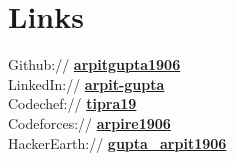 \documentclass[]{deedy-resume-openfont}
\begin{document}
\begin{minipage}[t]{0.35\textwidth}

\section{Links}
Github:// \href{https://github.com/arpitgupta1906}{\bf arpitgupta1906} \\
LinkedIn://  \href{https://www.linkedin.com/in/arpit-gupta-46462819b/}{\bf arpit-gupta} \\
Codechef://  \href{https://www.codechef.com/users/tipra19}{\bf tipra19} \\
Codeforces:// \href{https://codeforces.com/profile/arpire1906}{\bf arpire1906} \\
HackerEarth:// \href{https://www.hackerrank.com/gupta_arpit0619}{\bf gupta\_arpit1906} \\

%
%

\end{minipage}
\hfill
\end{document}
